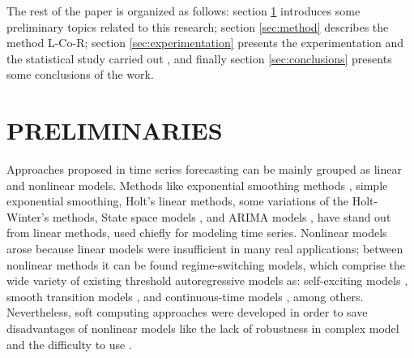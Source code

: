 \documentclass[a4paper,twoside]{article}
\newcommand{\metodo}{L-Co-R}
\begin{document}
The rest of the paper is organized as follows: section \ref{sec:preliminaries} introduces some preliminary topics related to this research; section \ref{sec:method} describes the method {\metodo}; section \ref{sec:experimentation} presents the experimentation and the statistical study carried out %
, and finally section \ref{sec:conclusions} presents some conclusions of the work.





\section{\uppercase{Preliminaries}}
\label{sec:preliminaries}

\noindent 


Approaches proposed in time series forecasting can be mainly grouped as linear and nonlinear models. Methods like exponential smoothing methods \cite{Winters1960}, simple exponential smoothing, Holt's linear methods, some variations of the Holt-Winter's methods, State space models \cite{Snyder1985}, and ARIMA models \cite{BoxJenk}, have stand out from linear methods, used chiefly for modeling time series. Nonlinear models arose because linear models were insufficient in many real applications; between nonlinear methods it can be found regime-switching models, which comprise the wide variety of existing threshold autoregressive models \cite{Tong1978} as: self-exciting models \cite{Tong1983}, smooth transition models \cite{Chan1986}, and continuous-time models \cite{Brockwell1992157}, among others. Nevertheless, soft computing approaches were developed in order to save disadvantages of nonlinear models like the lack of robustness in complex model and the difficulty to use \cite{Clements2004}.%

\end{document}
